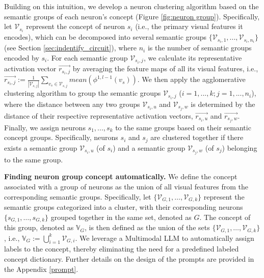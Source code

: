 Building on this intuition, we develop a neuron clustering algorithm based on the semantic groups of each neuron's concept (Figure \ref{fig:neuron group}). 
Specifically, let $\mathcal{V}_{s_i}$ represent the concept of neuron $s_i$ (i.e., the primary visual features it encodes), which can be decomposed into several semantic groups $\{\mathcal{V}_{s_i, 1}, ..., \mathcal{V}_{s_i, n_i}\}$ (see Section \ref{sec:indentify_circuit}), where $n_i$ is the number of semantic groups encoded by $s_i$. For each semantic group $\mathcal{V}_{s_i, j}$, we calculate its representative activation vector $\overrightarrow{r_{s_i,j}}$ by averaging the feature maps of all its visual features, i.e., $\overrightarrow{r_{s_i,j}}:= \frac{1}{|\mathcal{V}_{s, j}|}\sum_{v_s \in \mathcal{V}_{s, j}} mean(\phi^{1, l-1}(v_s))$.
We then apply the agglomerative clustering algorithm to group the semantic groups $\mathcal{V}_{s_i, j}$ ($i = 1,..., k; j = 1, ..., n_i$), where the distance between any two groups $\mathcal{V}_{s_i, u}$ and $\mathcal{V}_{s_j, w}$ is determined by the distance of their respective representative activation vectors, $\overrightarrow{r_{s_i,u}}$ and $\overrightarrow{r_{s_j,w}}$.
Finally, we assign neurons $s_1, ..., s_k$ to the same groups based on their semantic concept groups. Specifically, neurons $s_i$ and $s_j$ are clustered together if there exists a semantic group $\mathcal{V}_{s_i, u}$ (of $s_i$) and a semantic group $\mathcal{V}_{s_j, w}$ (of $s_j$) belonging to the same group. 

\textbf{Finding neuron group concept automatically.}
We define the concept associated with a group of neurons as the union of all visual features from the corresponding semantic groups. 
Specifically, let $\{\mathcal{V}_{G,1}, \dots, \mathcal{V}_{G,k}\}$ represent the semantic groups categorized into a cluster, with their corresponding neurons $\{s_{G,1}, \dots, s_{G,k}\}$ grouped together in the same set, denoted as $G$. 
The concept of this group, denoted as $\mathbb{V}_G$, is then defined as the union of the sets $\{\mathcal{V}_{G,1}, \dots, \mathcal{V}_{G,k}\}$, i.e., $\mathbb{V}_G := \bigcup_{i=1}^{k}\mathcal{V}_{G,i}$.
We leverage a Multimodal LLM to automatically assign labels to the concept, thereby eliminating the need for a predefined labeled concept dictionary. Further details on the design of the prompts are provided in the Appendix \ref{prompt}.

